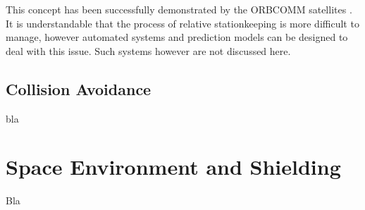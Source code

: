 This concept has been successfully demonstrated by the ORBCOMM satellites \cite{constDesign}. It is understandable that the process of relative stationkeeping is more difficult to manage, however automated systems and prediction models can be designed to deal with this issue. Such systems however are not discussed here.  

\subsection{Collision Avoidance}
\label{frSSCA}

bla

\section{Space Environment and Shielding}
\label{frSEaS}

Bla